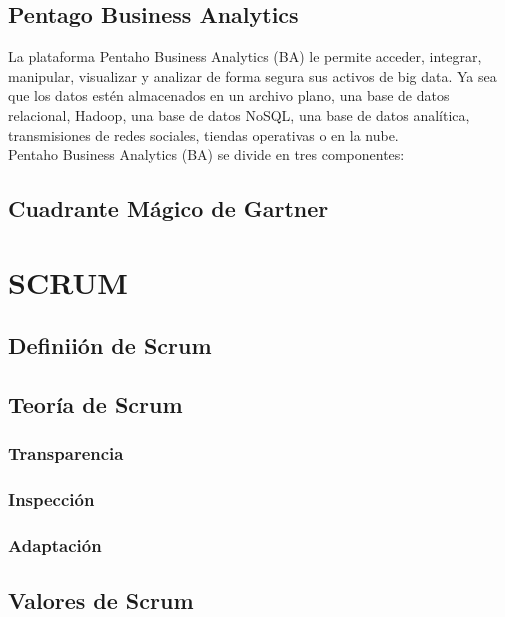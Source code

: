 \begin{spacing}{1.5}
	\subsection{Pentago Business Analytics}
		La plataforma Pentaho Business Analytics (BA) le permite acceder, integrar, manipular, visualizar y analizar de forma segura sus activos de big data. Ya sea que los datos estén almacenados en un archivo plano, una base de datos relacional, Hadoop, una base de datos NoSQL, una base de datos analítica, transmisiones de redes sociales, tiendas operativas o en la nube.\\
		Pentaho Business Analytics (BA) se divide en tres componentes:
		
	\subsection{Cuadrante M\'{a}gico de Gartner}
			\lipsum[1-2]

\section{SCRUM}
			\lipsum[1]
	\subsection{Definii\'{o}n de Scrum}
				\lipsum[1]
	\subsection{Teor\'{i}a de Scrum}
				\lipsum[1]
		\subsubsection{Transparencia}
					\lipsum[1]
		\subsubsection{Inspecci\'{o}n}
					\lipsum[1]
		\subsubsection{Adaptaci\'{o}n}
					\lipsum[1]
	\subsection{Valores de Scrum}
				\lipsum[1]

\end{spacing}
